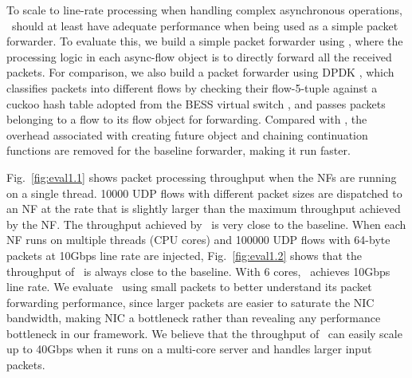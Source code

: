 To scale to line-rate processing when handling complex asynchronous operations, \netstar~should at least have adequate performance when being used as a simple packet forwarder. To evaluate this, we build a simple packet forwarder using \netstar, where the processing logic in each async-flow object is to directly forward all the received packets. For comparison, we also build a packet forwarder using DPDK \cite{dpdk}, which classifies packets into different flows by checking their flow-5-tuple against a cuckoo hash table adopted from the BESS virtual switch \cite{bess}, and passes packets belonging to a flow to its flow object for forwarding.
Compared with \netstar, the overhead associated with creating future object and chaining continuation functions are removed for the baseline forwarder, making it run faster. %


Fig.~\ref{fig:eval1.1} shows packet processing throughput when the NFs are running on a single thread. 10000 UDP flows with different packet sizes are dispatched to an NF at the rate that is slightly larger than the maximum throughput achieved by the NF.
The throughput achieved by \netstar~is very close to the baseline. %
When each NF runs on multiple threads (CPU cores) and 100000 UDP flows with 64-byte packets at 10Gbps line rate are injected, Fig.~\ref{fig:eval1.2} shows that the throughput of \netstar~is always close to the baseline. With 6 cores, \netstar~achieves 10Gbps line rate. %
We evaluate \netstar~using small packets to better understand its packet forwarding performance, since larger packets are easier to saturate the NIC bandwidth, making NIC a bottleneck rather than revealing any performance bottleneck in our framework. We believe that the throughput of \netstar~can easily scale up to 40Gbps when it runs on a multi-core server and handles larger input packets.

